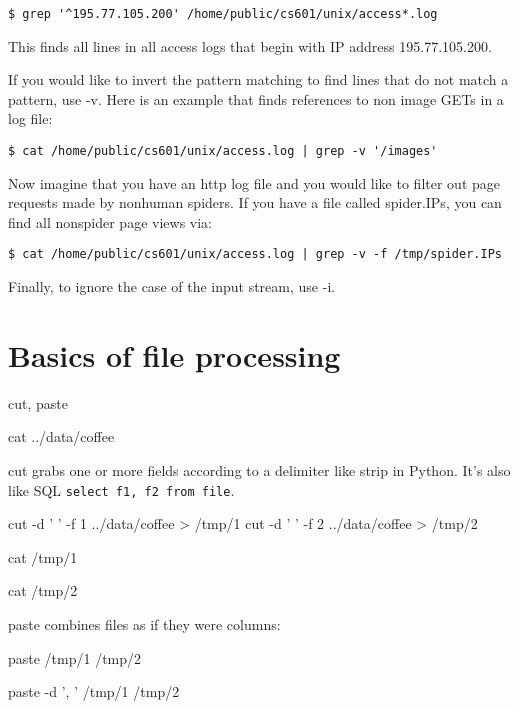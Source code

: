 \begin{fullwidth}
\begin{lstlisting}[style=BashInputStyle]
$ grep '^195.77.105.200' /home/public/cs601/unix/access*.log
\end{lstlisting}

\noindent This finds all lines in all access logs that begin with IP address 195.77.105.200.

If you would like to invert the pattern matching to find lines that do not match a pattern, use -v. Here is an example that finds references to non image GETs in a log file:

\begin{lstlisting}[style=BashInputStyle]
$ cat /home/public/cs601/unix/access.log | grep -v '/images'
\end{lstlisting}

Now imagine that you have an http log file and you would like to filter out page requests made by nonhuman spiders. If you have a file called spider.IPs, you can find all nonspider page views via:

\begin{lstlisting}[style=BashInputStyle]
$ cat /home/public/cs601/unix/access.log | grep -v -f /tmp/spider.IPs
\end{lstlisting}

Finally, to ignore the case of the input stream, use -i.

\section{Basics of file processing}

cut, paste

{\small
\bash[script,stdout,prefix=$]
cat ../data/coffee
\END
}

cut grabs one or more fields according to a delimiter like strip in Python. It's also like SQL {\tt select f1, f2 from file}.

{\small
\bash[script,stdout,prefix=$]
cut -d ' ' -f 1 ../data/coffee > /tmp/1
cut -d ' ' -f 2 ../data/coffee > /tmp/2
\END
}

{\small
\bash[script,stdout,prefix=$]
cat /tmp/1
\END
}

{\small
\bash[script,stdout,prefix=$]
cat /tmp/2
\END
}

paste combines files as if they were columns:

{\small
\bash[script,stdout,prefix=$]
paste /tmp/1 /tmp/2
\END
}

{\small
\bash[script,stdout,prefix=$]
paste -d ', ' /tmp/1 /tmp/2
\END
}


\end{fullwidth}

